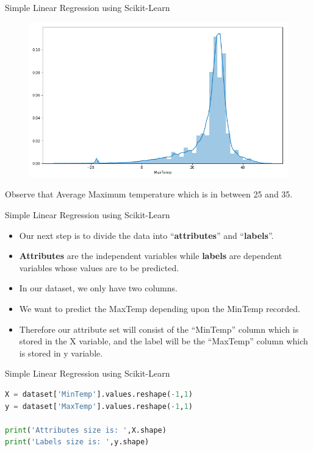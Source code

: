 \documentclass[12pt,xcolor={dvipsnames}]{beamer}
\begin{document}
\begin{frame}{Simple Linear Regression using Scikit-Learn}
\begin{figure}
\centering
\includegraphics[scale=0.3]{LR_Reg5.png}
\end{figure}
Observe that Average Maximum temperature which is in between 25 and 35.
\end{frame}

\begin{frame}{Simple Linear Regression using Scikit-Learn}
\begin{itemize}
\item Our next step is to divide the data into ``\textbf{attributes}'' and ``\textbf{labels}''.
\item \textbf{Attributes} are the independent variables while \textbf{labels} are dependent
variables whose values are to be predicted.
\item In our dataset, we only have two columns.
\item We want to predict the MaxTemp depending upon the MinTemp
recorded.
\item Therefore our attribute set will consist of the ``MinTemp''
column which is stored in the X variable, and the label will be the
``MaxTemp'' column which is stored in y variable.
\end{itemize}
\end{frame}

\begin{frame}[fragile]{Simple Linear Regression using Scikit-Learn}
\begin{lstlisting}[language=Python]
X = dataset['MinTemp'].values.reshape(-1,1)
y = dataset['MaxTemp'].values.reshape(-1,1)

print('Attributes size is: ',X.shape)
print('Labels size is: ',y.shape)
\end{lstlisting}
\end{frame}
\end{document}
